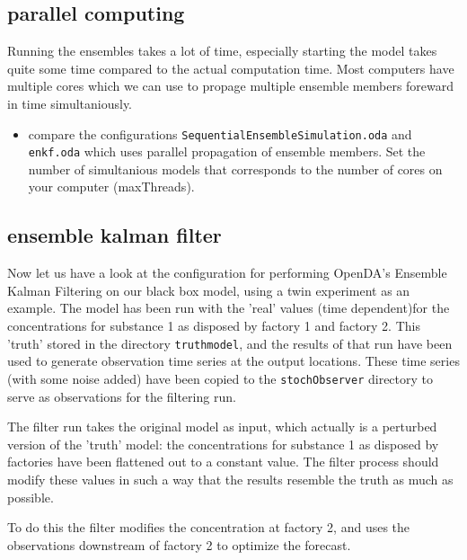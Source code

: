 \subsection{parallel computing}
Running the ensembles takes a lot of time, especially starting the model takes quite some time compared to the actual computation time. Most computers have multiple cores which we can use to propage multiple ensemble members foreward in time simultaniously.
\begin{itemize}
	\item compare the configurations {\tt SequentialEnsembleSimulation.oda} and 
		{\tt enkf.oda} which uses parallel propagation of ensemble members. Set the number of simultanious models that corresponds to the number of cores on your computer (maxThreads).
\end{itemize}

\subsection{ensemble kalman filter}


Now let us have a look at the configuration for performing OpenDA's Ensemble
Kalman Filtering on our black box model, using a twin experiment as an example.
The model has been run with the 'real' values (time dependent)for the
concentrations for substance 1 as disposed by factory 1 and factory 2. This
'truth' stored in the directory {\tt truthmodel}, and the results of that run
have been used to generate observation time series at the output locations.
These time series (with some noise added) have been copied to the {\tt stochObserver} directory to
serve as observations for the filtering run.

The filter run takes the original model as input, which actually is a perturbed
version of the 'truth' model: the concentrations for substance 1 as disposed by
factories have been flattened out to a constant value. The filter process
should modify these values in such a way that the results resemble the truth as
much as possible.

To do this the filter modifies the concentration at factory 2, and uses the
observations downstream of factory 2 to optimize the forecast.

